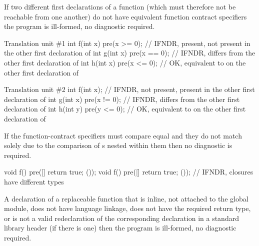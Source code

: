 
\pnum
If two different first declarations of a function
(which must therefore not be reachable from one another)
do not have equivalent function contract specifiers
the program is ill-formed, no diagnostic required.

\pnum
\begin{example}
\begin{codeblocktu}{Translation unit \#1}
int f(int x) pre(x >= 0);       // IFNDR,  present, not present in the other first declaration of 
int g(int x) pre(x == 0);       // IFNDR,  differs from the other first declaration of 
int h(int x) pre(x <= 0);       // OK,  equivalent to  on the other first declaration of 
\end{codeblocktu}
\begin{codeblocktu}{Translation unit \#2}
int f(int x);                   // IFNDR,  not present, present in the other first declaration of 
int g(int x) pre(x != 0);       // IFNDR,  differs from the other first declaration of 
int h(int y) pre(y <= 0);       // OK,  equivalent to  on the other first declaration of 
\end{codeblocktu}
\end{example}


\pnum
If the function-contract specifiers
must compare equal
and they do not match
solely due to the comparison of s
nested within them
then no diagnostic is required.

\pnum
\begin{example}
\begin{codeblock}
void f() pre([]{ return true; }());
void f() pre([]{ return true; }());     // IFNDR, closures have different types
\end{codeblock}
\end{example}


\pnum
A declaration of a replaceable function
that is inline,
not attached to the global module,
does not have \Cpp{} language linkage,
does not have the required return type,
or is not a valid redeclaration of the
corresponding declaration in a standard library header (if there is one)
then the program is ill-formed, no diagnostic required.

